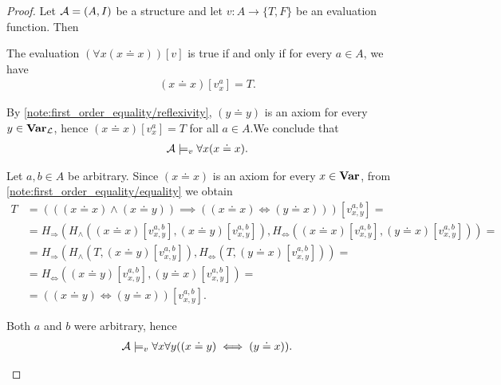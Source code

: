 \begin{proof}
  Let $\mathcal A = (A, I)$ be a structure and let $v: A \to \{ T, F \}$ be an evaluation function. Then

  \begin{description}
     The evaluation $(\forall x (x \doteq x))[v]$ is true if and only if for every $a \in A$, we have
    \begin{align*}
      (x \doteq x)[v_x^a] = T.
    \end{align*}

    By \cref{note:first_order_equality/reflexivity}, $(y \doteq y)$ is an axiom for every $y \in \operatorname{\mathbf{Var}}_{\mathcal L}$, hence \mbox{$(x \doteq x)[v_x^a] = T$} for all $a \in A$.We conclude that
    \begin{align*}
      \mathcal A \models_v \forall x (x \doteq x).
    \end{align*}

     Let $a, b \in A$ be arbitrary. Since $(x \doteq x)$ is an axiom for every $x \in \operatorname{\mathbf{Var}}$, from \cref{note:first_order_equality/equality} we obtain
    \begin{align*}
      T &=
      (((x \doteq x) \land (x \doteq y)) \implies ((x \doteq x) \iff (y \doteq x)))[v_{x,y}^{a,b}]
      = \\ &=
      H_\Rightarrow(H_\land((x \doteq x)[v_{x,y}^{a,b}], (x \doteq y)[v_{x,y}^{a,b}]), H_\Leftrightarrow((x \doteq x)[v_{x,y}^{a,b}], (y \doteq x)[v_{x,y}^{a,b}]))
      = \\ &=
      H_\Rightarrow(H_\land(T, (x \doteq y)[v_{x,y}^{a,b}]), H_\Leftrightarrow(T, (y \doteq x)[v_{x,y}^{a,b}]))
      = \\ &=
      H_\Leftrightarrow((x \doteq y)[v_{x,y}^{a,b}], (y \doteq x)[v_{x,y}^{a,b}])
      = \\ &=
      ((x \doteq y) \iff (y \doteq x))[v_{x,y}^{a,b}].
    \end{align*}

    Both $a$ and $b$ were arbitrary, hence
    \begin{align*}
      \mathcal A \models_v \forall x \forall y ((x \doteq y) \iff (y \doteq x)).
    \end{align*}


\end{description}
\end{proof}
